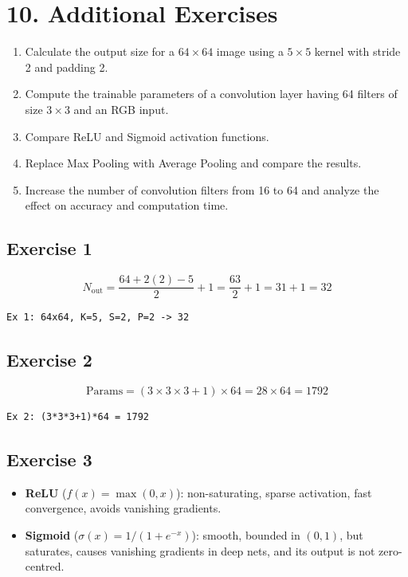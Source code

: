 \documentclass[11pt]{article}
\begin{document}
\section*{10. Additional Exercises}

\begin{enumerate}
\item Calculate the output size for a $64\times64$ image using a $5\times5$ kernel with stride 2 and padding 2.
\item Compute the trainable parameters of a convolution layer having 64 filters of size $3\times3$ and an RGB input.
\item Compare ReLU and Sigmoid activation functions.
\item Replace Max Pooling with Average Pooling and compare the results.
\item Increase the number of convolution filters from 16 to 64 and analyze the effect on accuracy and computation time.
\end{enumerate}

\subsection*{Exercise 1}

\[
N_{\text{out}} = \frac{64 + 2(2) - 5}{2} + 1 = \frac{63}{2} + 1 = 31 + 1 = 32
\]

\begin{verbatim}
Ex 1: 64x64, K=5, S=2, P=2 -> 32
\end{verbatim}

\subsection*{Exercise 2}

\[
\text{Params} = (3\times3\times3 + 1)\times 64 = 28 \times 64 = 1792
\]

\begin{verbatim}
Ex 2: (3*3*3+1)*64 = 1792
\end{verbatim}

\subsection*{Exercise 3}

\begin{itemize}
\item \textbf{ReLU} ($f(x)=\max(0,x)$): non-saturating, sparse activation, fast convergence, avoids vanishing gradients.
\item \textbf{Sigmoid} ($\sigma(x)=1/(1+e^{-x})$): smooth, bounded in $(0,1)$, but saturates, causes vanishing gradients in deep nets, and its output is not zero-centred.
\end{itemize}
\end{document}
